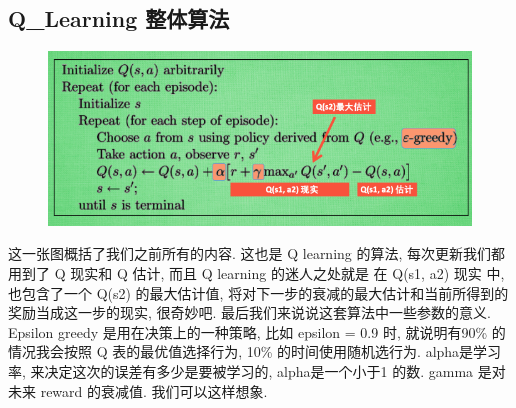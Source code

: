 \documentclass{beamer}
\begin{document}
\subsection{Q\_Learning 整体算法}
\begin{frame}
    \begin{minipage}{0.5\linewidth}
        \medskip
        \begin{figure}[h]
            \centering
            \includegraphics[height=.4\textheight]{pic/3.png}
        \end{figure}
    \end{minipage}
    \tiny
    \item 这一张图概括了我们之前所有的内容. 这也是 Q learning 的算法, 每次更新我们都用到了 Q 现实和 Q 估计, 而且 Q learning 的迷人之处就是 在 Q(s1, a2) 现实 中, 也包含了一个 Q(s2) 的最大估计值, 将对下一步的衰减的最大估计和当前所得到的奖励当成这一步的现实, 很奇妙吧. 最后我们来说说这套算法中一些参数的意义. Epsilon greedy 是用在决策上的一种策略, 比如 epsilon = 0.9 时, 就说明有90\% 的情况我会按照 Q 表的最优值选择行为, 10\% 的时间使用随机选行为. alpha是学习率, 来决定这次的误差有多少是要被学习的, alpha是一个小于1 的数. gamma 是对未来 reward 的衰减值. 我们可以这样想象.
    
\end{frame}
\end{document}
